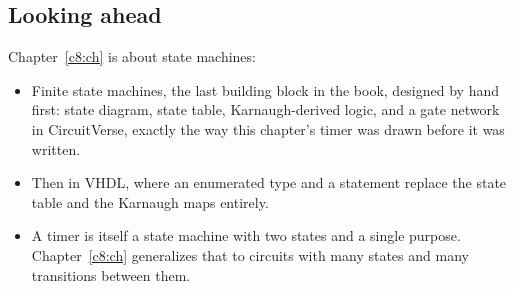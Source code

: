 \subsection*{Looking ahead}
Chapter~\ref{c8:ch} is about state machines:
\begin{itemize}
  \item Finite state machines, the last building block in the book, designed by hand first: state
    diagram, state table, Karnaugh-derived logic, and a gate network in CircuitVerse, exactly the
    way this chapter's timer was drawn before it was written.
  \item Then in VHDL, where an enumerated type and a  statement replace the state table
    and the Karnaugh maps entirely.
  \item A timer is itself a state machine with two states and a single purpose.
    Chapter~\ref{c8:ch} generalizes that to circuits with many states and many transitions between
    them.
\end{itemize}
